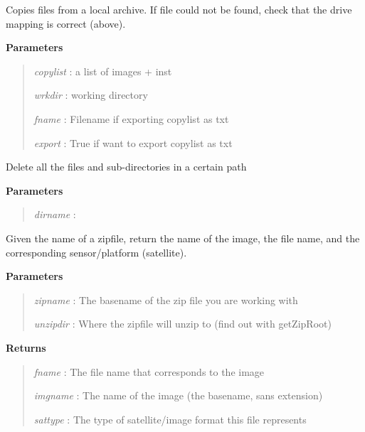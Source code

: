 \documentclass[letterpaper,10pt,openany,oneside]{sphinxmanual}
\begin{document}

\begin{fulllineitems}
\label{code:Util.copyfiles}
Copies files from a local archive. If file could not be found, check that the 
drive mapping is correct (above).

\textbf{Parameters}
\begin{quote}

\emph{copylist} : a list of images + inst

\emph{wrkdir}   : working directory

\emph{fname}    : Filename if exporting copylist as txt

\emph{export}   : True if want to export copylist as txt
\end{quote}

\end{fulllineitems}


\begin{fulllineitems}
\label{code:Util.deltree}
Delete all the files and sub-directories in a certain path

\textbf{Parameters}
\begin{quote}

\emph{dirname}   :
\end{quote}

\end{fulllineitems}


\begin{fulllineitems}
\label{code:Util.getFilename}
Given the name of a zipfile, return the name of the image,
the file name, and the corresponding sensor/platform (satellite).

\textbf{Parameters}
\begin{quote}

\emph{zipname}  : The basename of the zip file you are working with

\emph{unzipdir} : Where the zipfile will unzip to (find out with getZipRoot)
\end{quote}

\textbf{Returns}
\begin{quote}

\emph{fname}    :  The file name that corresponds to the image

\emph{imgname}  : The name of the image (the basename, sans extension)

\emph{sattype}  : The type of satellite/image format this file represents
\end{quote}

\end{fulllineitems}
\end{document}
